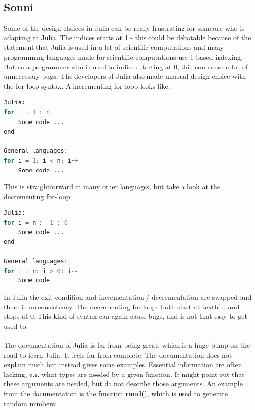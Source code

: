 \documentclass[a4paper, 11pt, titlepage]{article}
\begin{document}
\subsection{Sonni}
Some of the design choices in Julia can be really frustrating for someone who is adapting to Julia. The indices starts at 1 - this could be debatable because of the statement that Julia is used in a lot of scientific computations and many programming languages made for scientific computations use 1-based indexing. But as a programmer who is used to indices starting at 0, this can cause a lot of unnecessary bugs. The developers of Julia also made unusual design choice with the for-loop syntax. A incrementing for loop looks like:
\begin{lstlisting}[language=python]
Julia:
for i = 1 : n
	Some code ...
end

General languages:
for i = 1; i < n; i++
	Some code ...
\end{lstlisting}
This is straightforward in many other languages, but take a look at the decrementing for-loop:
\begin{lstlisting}[language=python]
Julia:
for i = n : -1 : 0
	Some code ...
end

General languages:
for i = n; i > 0; i--
	Some code
\end{lstlisting}
In Julia the exit condition and incrementation / decrementation are swapped and there is no consistency. The decrementing for-loops both start at textbf{n}, and stops at 0. This kind of syntax can again cause bugs, and is not that easy to get used to.\\
\\
The documentation of Julia is far from being great, which is a huge bump on the road to learn Julia. It feels far from complete. The documentation does not explain much but instead gives some examples. Essential information are often lacking, e.g. what types are needed by a given function. It might point out that these arguments are needed, but do not describe those arguments. An example from the documentation is the function \textbf{rand()}, which is used to generate random numbers:
\end{document}
